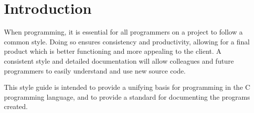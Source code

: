 \documentclass[StyleGuide.tex]{subfiles}
\begin{document}
\begin{titlepage}
	\maketitle
	\copyrightpage
	\thispagestyle{empty}
\end{titlepage}

\tableofcontents

\newpage
\chapter*{Introduction}\label{ch:introduction}
When programming, it is essential for all programmers on a project to follow a
common style. Doing so ensures consistency and productivity, allowing for a
final product which is better functioning and more appealing to the client.
A consistent style and detailed documentation will allow colleagues and future
programmers to easily understand and use new source code.

This style guide is intended to provide a unifying basis for programming in the
C programming language, and to provide a standard for documenting the programs
created.

\cleardoublepage
{} %
\end{document}
